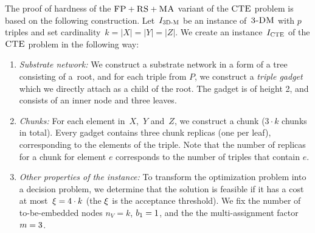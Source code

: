 The proof of hardness of the $\textsc{FP}+\textsc{RS}+\textsc{MA}$ variant of the $\textsc{CTE}$ problem is based on the following construction.
Let~$I_{\mathrm{\textsc{3D-M}}}$ be an instance of~$\textsc{3-DM}$ with $p$ triples and set cardinality~${k = |X| = |Y| = |Z|}$.
We create an instance~$I_{\mathrm{\textsc{CTE}}}$ of the $\textsc{CTE}$ problem in the following way:
\begin{enumerate}
\item \emph{Substrate network:} We construct a substrate network in a form of a tree consisting of a~root,
and for each triple from $P$, we construct a \emph{triple gadget} which we directly attach as
a child of the root. The gadget is of height 2,
and consists of an inner node and three leaves.
\item \emph{Chunks:} For each element in~$X$,~$Y$ and~$Z$,
 we construct a chunk
($3 \cdot k$ chunks in total). Every gadget contains three chunk replicas (one per leaf),
corresponding to the elements of the triple.
Note that the number of replicas for a chunk for element $e$ corresponds to the number of triples that contain $e$.
\item \emph{Other properties of the instance:}
To transform the optimization problem into a decision problem, we determine that the solution is feasible if it has a cost at most~$\xi = 4\cdot k$ (the $\xi$ is the acceptance threshold).
We fix the number of to-be-embedded nodes $n_V = k$,
$b_1 = 1$, and the the multi-assignment factor
$m=3$.
\end{enumerate}

%



